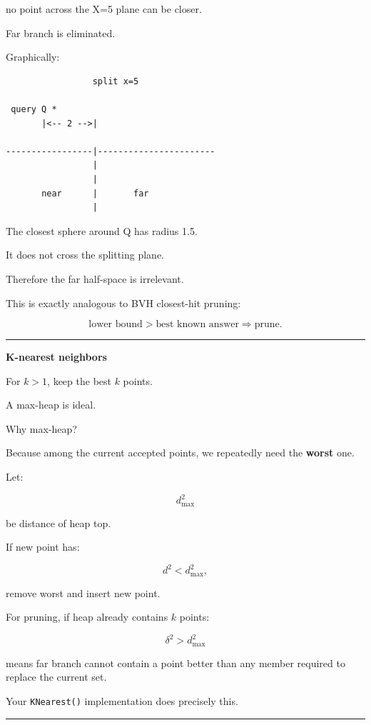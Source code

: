 no point across the X=5 plane can be closer.

Far branch is eliminated.

Graphically:

\begin{verbatim}
                 split x=5

 query Q *
       |<-- 2 -->|

-----------------|-----------------------
                 |
                 |
       near      |       far
                 |
\end{verbatim}

The closest sphere around Q has radius 1.5.

It does not cross the splitting plane.

Therefore the far half-space is irrelevant.

This is exactly analogous to BVH closest-hit pruning:

\[
\text{lower bound}>
\text{best known answer}
\Rightarrow
\text{prune}.
\]

\begin{center}\rule{0.5\linewidth}{0.5pt}\end{center}

\textbf{K-nearest neighbors}

For \(k>1\), keep the best \(k\) points.

A max-heap is ideal.

Why max-heap?

Because among the current accepted points, we repeatedly need the \textbf{worst} one.

Let:

\[
d^2_{\max}
\]

be distance of heap top.

If new point has:

\[
d^2<d^2_{\max},
\]

remove worst and insert new point.

For pruning, if heap already contains \(k\) points:

\[
\delta^2>
d^2_{\max}
\]

means far branch cannot contain a point better than any member required to replace the current set.

Your \texttt{KNearest()} implementation does precisely this.

\begin{center}\rule{0.5\linewidth}{0.5pt}\end{center}

